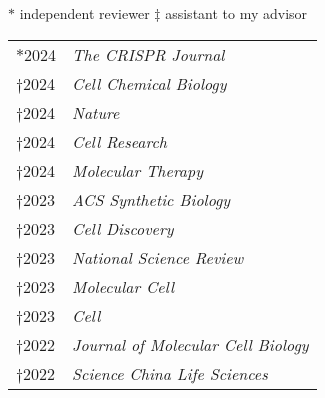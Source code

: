 






% 

\small
$*$ independent reviewer \hspace{2em}  $\ddag$ assistant to my advisor


\begin{longtable}[l]{@{}p{} p{}}
    $*$2024 & \textit{The CRISPR Journal} \\
    $\dagger$2024 & \textit{Cell Chemical Biology} \\
    $\dagger$2024 & \textit{Nature} \\
    $\dagger$2024 & \textit{Cell Research} \\
    $\dagger$2024 & \textit{Molecular Therapy} \\
    $\dagger$2023 & \textit{ACS Synthetic Biology} \\
    $\dagger$2023 & \textit{Cell Discovery} \\
    $\dagger$2023 & \textit{National Science Review} \\
    $\dagger$2023 & \textit{Molecular Cell} \\
    $\dagger$2023 & \textit{Cell} \\
    $\dagger$2022 & \textit{Journal of Molecular Cell Biology} \\
    $\dagger$2022 & \textit{Science China Life Sciences} \\
\end{longtable}

